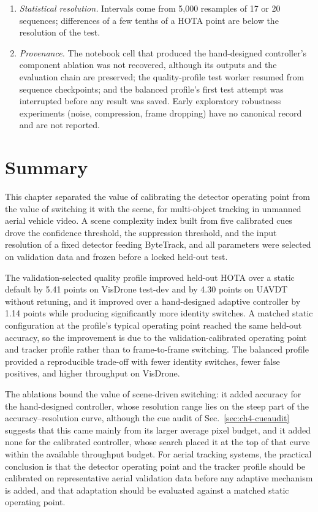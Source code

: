 \begin{enumerate}
\item \emph{Statistical resolution.} Intervals come from 5,000 resamples of 17 or 20 sequences; differences of a few tenths of a HOTA point are below the resolution of the test.
\item \emph{Provenance.} The notebook cell that produced the hand-designed controller's component ablation was not recovered, although its outputs and the evaluation chain are preserved; the quality-profile test worker resumed from sequence checkpoints; and the balanced profile's first test attempt was interrupted before any result was saved. Early exploratory robustness experiments (noise, compression, frame dropping) have no canonical record and are not reported.
\end{enumerate}

\section{Summary}\label{sec:ch4-conclusions}
This chapter separated the value of calibrating the detector operating point from the value of switching it with the scene, for multi-object tracking in unmanned aerial vehicle video. A scene complexity index built from five calibrated cues drove the confidence threshold, the suppression threshold, and the input resolution of a fixed detector feeding ByteTrack, and all parameters were selected on validation data and frozen before a locked held-out test.

The validation-selected quality profile improved held-out HOTA over a static default by 5.41 points on VisDrone test-dev and by 4.30 points on UAVDT without retuning, and it improved over a hand-designed adaptive controller by 1.14 points while producing significantly more identity switches. A matched static configuration at the profile's typical operating point reached the same held-out accuracy, so the improvement is due to the validation-calibrated operating point and tracker profile rather than to frame-to-frame switching. The balanced profile provided a reproducible trade-off with fewer identity switches, fewer false positives, and higher throughput on VisDrone.

The ablations bound the value of scene-driven switching: it added accuracy for the hand-designed controller, whose resolution range lies on the steep part of the accuracy--resolution curve, although the cue audit of Sec.~\ref{sec:ch4-cueaudit} suggests that this came mainly from its larger average pixel budget, and it added none for the calibrated controller, whose search placed it at the top of that curve within the available throughput budget. For aerial tracking systems, the practical conclusion is that the detector operating point and the tracker profile should be calibrated on representative aerial validation data before any adaptive mechanism is added, and that adaptation should be evaluated against a matched static operating point.


